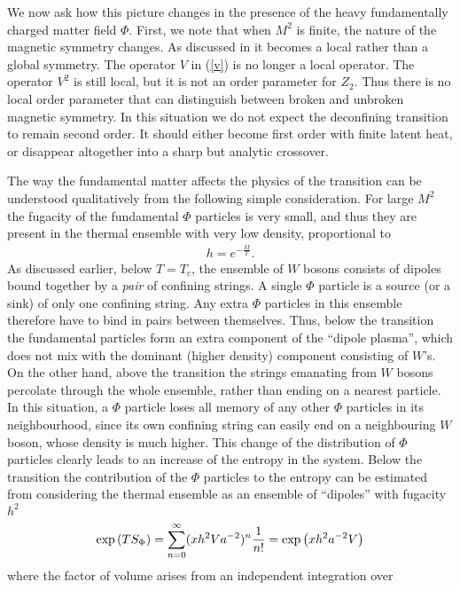 \documentclass[a4paper,aps,prd,superscriptaddress,showpacs,showkeys]{revtex4}
\begin{document}
We now ask how this picture changes in the presence of the heavy
fundamentally charged  matter field $\Phi$.
First, we note that when $M^2$ is finite, the nature of the magnetic
symmetry
changes. As discussed in \cite{fosco} it becomes a local rather than a
global
symmetry. The operator $V$ in (\ref{v}) is no longer a local operator.
The operator $V^2$ is still local, but it is not an order parameter for
$Z_2$. Thus there is no local order parameter that can distinguish
between
broken and unbroken magnetic symmetry. In this situation we do not expect
the  deconfining transition to remain second order. It should either
become first order with finite latent heat, or disappear altogether
into a
sharp but analytic crossover.

The way the fundamental matter affects the physics of the transition can
be understood
qualitatively from the following simple consideration.
For large $M^2$ the fugacity of the fundamental $\Phi$ particles is very
small, and thus they are present in the thermal ensemble
with very low density, proportional to
\begin{eqnarray}h=e^{-\frac{M}{T}} .
\end{eqnarray}As discussed earlier, below $T=T_c$, the ensemble of $W$
bosons
consists of dipoles bound together by a {\it pair} of confining strings.
A single $\Phi$ particle is a source (or a sink) of only one confining
string.
Any extra $\Phi$ particles in this ensemble therefore
have to bind in pairs between themselves. Thus, below the transition the
fundamental particles form an extra component of the ``dipole plasma'',
which does not
mix with the dominant (higher density) component consisting of $W$'s.
On the other hand, above the transition the strings emanating from $W$
bosons percolate through the whole ensemble, rather than ending on a
nearest particle.  In this situation, a $\Phi$ particle loses all memory
of any other $\Phi$ particles in its neighbourhood, since its own
confining string can easily end on a neighbouring $W$ boson, whose
density
is much higher. This change of the distribution of $\Phi$ particles
clearly leads to an increase of the entropy in the system.
Below the transition the contribution of the $\Phi$ particles to the
entropy can be estimated from
considering the thermal ensemble as an ensemble of ``dipoles''
with fugacity $h^2$
\begin{eqnarray}
\exp\,(TS_\Phi)=\sum_{n=0}^{\infty}(xh^2Va^{-2})^n{1\over
n!}=\exp\left( xh^2a^{-2}V\right)
\end{eqnarray}
where the factor of volume arises from an independent integration over
\end{document}
